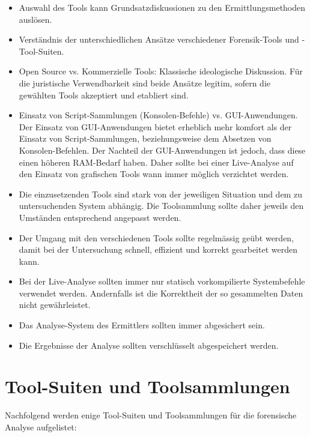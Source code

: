 \begin{itemize}
\item Auswahl des Tools kann Grundsatzdiskussionen zu den Ermittlungsmethoden auslösen.
\item Verständnis der unterschiedlichen Ansätze verschiedener Forensik-Tools und -Tool-Suiten.
\item Open Source vs. Kommerzielle Tools: Klassische ideologische Diskussion. Für die juristische Verwendbarkeit sind beide Ansätze legitim, sofern die gewählten Tools akzeptiert und etabliert sind.
\item Einsatz von Script-Sammlungen (Konsolen-Befehle) vs. GUI-Anwendungen. Der Einsatz von GUI-Anwendungen bietet erheblich mehr komfort als der Einsatz von Script-Sammlungen, beziehungsweise dem Absetzen von Konsolen-Befehlen. Der Nachteil der GUI-Anwendungen ist jedoch, dass diese einen höheren RAM-Bedarf haben. Daher sollte bei einer Live-Analyse auf den Einsatz von grafischen Tools wann immer möglich verzichtet werden.
\item Die einzusetzenden Tools sind stark von der jeweiligen Situation und dem zu untersuchenden System abhängig. Die Toolsammlung sollte daher jeweils den Umständen entsprechend angepasst werden.
\item Der Umgang mit den verschiedenen Tools sollte regelmässig geübt werden, damit bei der Untersuchung schnell, effizient und korrekt gearbeitet werden kann.
\item Bei der Live-Analyse sollten immer nur statisch vorkompilierte Systembefehle verwendet werden. Andernfalls ist die Korrektheit der so gesammelten Daten nicht gewährleistet.
\item Das Analyse-System des Ermittlers sollten immer abgesichert sein.
\item Die Ergebnisse der Analyse sollten verschlüsselt abgespeichert werden.
\end{itemize}



\section{Tool-Suiten und Toolsammlungen}
Nachfolgend werden enige Tool-Suiten und Toolsammlungen für die forensische Analyse aufgelistet:

